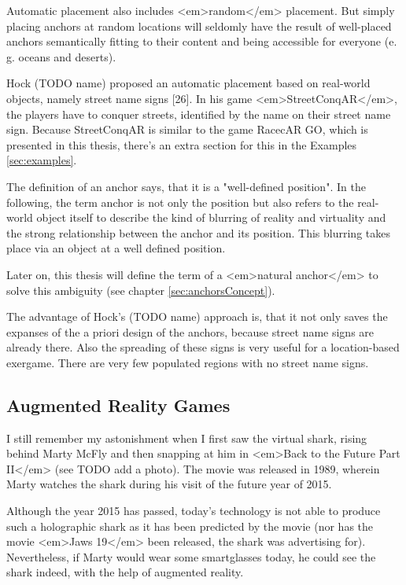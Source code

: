 Automatic placement also includes <em>random</em> placement. But simply placing anchors at random locations will seldomly have the result of well-placed anchors semantically fitting to their content and being accessible for everyone (e. g. oceans and deserts).

Hock (TODO name) proposed an automatic placement based on real-world objects, namely street name signs [26]. In his game <em>StreetConqAR</em>, the players have to conquer streets, identified by the name on their street name sign. Because StreetConqAR is similar to the game RacecAR GO, which is presented in this thesis, there's an extra section for this in the Examples \ref{sec:examples}.

The definition of an anchor says, that it is a "well-defined position". In the following, the term anchor is not only the position but also refers to the real-world object itself to describe the kind of blurring of reality and virtuality and the strong relationship between the anchor and its position. This blurring takes place via an object at a well defined position.

Later on, this thesis will define the term of a <em>natural anchor</em> to solve this ambiguity (see chapter \ref{sec:anchorsConcept}).

The advantage of Hock's (TODO name) approach is, that it not only saves the expanses of the a priori design of the anchors, because street name signs are already there. Also the spreading of these signs is very useful for a location-based exergame. There are very few populated regions with no street name signs.

\subsection{Augmented Reality Games}\label{sec:augmentedRealityStateOfTheArt}
I still remember my astonishment when I first saw the virtual shark, rising behind Marty McFly and then snapping at him in <em>Back to the Future Part II</em> (see TODO add a photo). The movie was released in 1989, wherein Marty watches the shark during his visit of the future year of 2015.

Although the year 2015 has passed, today’s technology is not able to produce such a holographic shark as it has been predicted by the movie (nor has the movie <em>Jaws 19</em> been released, the shark was advertising for).
Nevertheless, if Marty would wear some smartglasses today, he could see the shark indeed, with the help of augmented reality.

